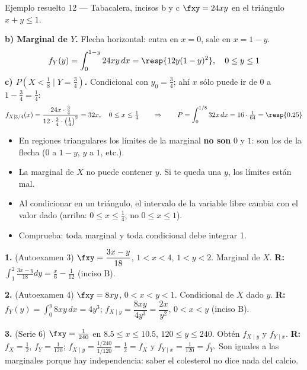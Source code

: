 \begin{ejemplo}{Ejemplo resuelto 12 --- Tabacalera, incisos b y c }
$\fxy=24xy$ en el tri\'angulo $x+y\le1$.

\textbf{b) Marginal de $Y$.} Flecha horizontal: entra en $x=0$, sale en $x=1-y$.
\[
f_Y(y)=\int_0^{1-y}24xy\,dx=\resp{12y(1-y)^2},\quad0\le y\le1
\]
\textbf{c) $P(X<\tfrac18\mid Y=\tfrac34)$.} Condicional con $y_0=\tfrac34$; ah\'i $x$ s\'olo puede ir de 0 a $1-\tfrac34=\tfrac14$:
\[
f_{X\mid 3/4}(x)=\frac{24x\cdot\frac34}{12\cdot\frac34\cdot\big(\frac14\big)^2}=32x,\quad0\le x\le\tfrac14
\qquad\Rightarrow\qquad
P=\int_0^{1/8}32x\,dx=16\cdot\tfrac{1}{64}=\resp{0.25}
\]
\end{ejemplo}

\begin{trampa}
\begin{itemize}
\item En regiones triangulares los l\'imites de la marginal \textbf{no son} $0$ y $1$: son los de la flecha ($0$ a $1-y$, $y$ a $1$, etc.).
\item La marginal de $X$ no puede contener $y$. Si te queda una $y$, los l\'imites est\'an mal.
\item Al condicionar en un tri\'angulo, el intervalo de la variable libre cambia con el valor dado (arriba: $0\le x\le\frac14$, no $0\le x\le1$).
\item Comprueba: toda marginal y toda condicional debe integrar 1.
\end{itemize}
\end{trampa}

\begin{mecaniza}
\textbf{1.} (Autoexamen 3) $\fxy=\dfrac{3x-y}{18}$, $1<x<4$, $1<y<2$. Marginal de $X$.
\quad\textbf{R:} $\int_1^2\frac{3x-y}{18}dy=\frac{x}{6}-\frac{1}{12}$ (inciso B).

\textbf{2.} (Autoexamen 4) $\fxy=8xy$, $0<x<y<1$. Condicional de $X$ dado $y$.
\quad\textbf{R:} $f_Y(y)=\int_0^y8xy\,dx=4y^3$; $f_{X\mid y}=\dfrac{8xy}{4y^3}=\dfrac{2x}{y^2}$, $0<x<y$ (inciso B).

\textbf{3.} (Serie 6) $\fxy=\tfrac1{240}$ en $8.5\le x\le10.5$, $120\le y\le240$. Obt\'en $f_{X\mid y}$ y $f_{Y\mid x}$.
\quad\textbf{R:} $f_X=\tfrac12$, $f_Y=\tfrac1{120}$; $f_{X\mid y}=\tfrac{1/240}{1/120}=\tfrac12=f_X$ y
$f_{Y\mid x}=\tfrac1{120}=f_Y$. Son iguales a las marginales porque hay independencia: saber el colesterol no dice nada del calcio.
\end{mecaniza}

